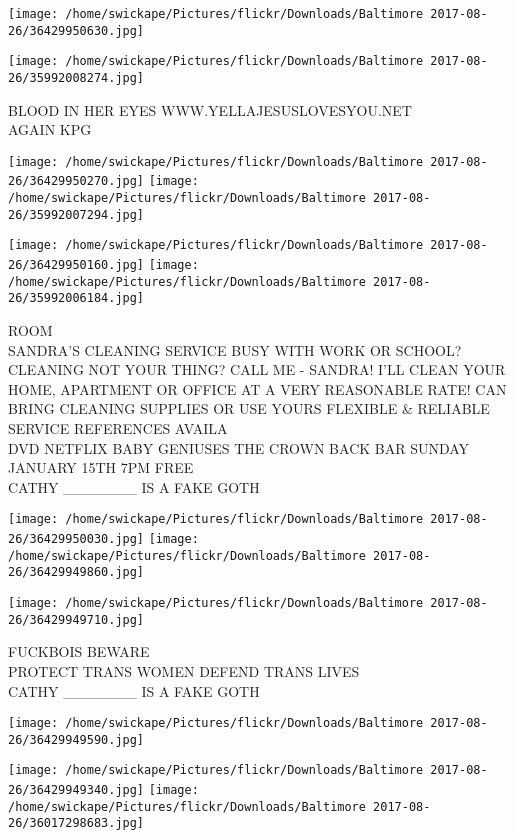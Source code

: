 \documentclass[10pt,letterpaper]{article}
\begin{document}
\texttt{[image: /home/swickape/Pictures/flickr/Downloads/Baltimore 2017-08-26/36429950630.jpg]}

\vspace{0.25in}
\texttt{[image: /home/swickape/Pictures/flickr/Downloads/Baltimore 2017-08-26/35992008274.jpg]}

BLOOD IN HER EYES WWW.YELLAJESUSLOVESYOU.NET\\
AGAIN KPG\\
\pagebreak

\texttt{[image: /home/swickape/Pictures/flickr/Downloads/Baltimore 2017-08-26/36429950270.jpg]}
\texttt{[image: /home/swickape/Pictures/flickr/Downloads/Baltimore 2017-08-26/35992007294.jpg]}

\texttt{[image: /home/swickape/Pictures/flickr/Downloads/Baltimore 2017-08-26/36429950160.jpg]}
\texttt{[image: /home/swickape/Pictures/flickr/Downloads/Baltimore 2017-08-26/35992006184.jpg]}

ROOM\\
SANDRA'S CLEANING SERVICE BUSY WITH WORK OR SCHOOL?  CLEANING NOT YOUR THING?  CALL ME {-} SANDRA!   I'LL CLEAN YOUR HOME, APARTMENT OR OFFICE AT A VERY REASONABLE RATE!  CAN BRING CLEANING SUPPLIES OR USE YOURS FLEXIBLE \& RELIABLE SERVICE REFERENCES AVAILA\\
DVD NETFLIX BABY GENIUSES THE CROWN BACK BAR SUNDAY JANUARY 15TH 7PM FREE\\
CATHY \_\_\_\_\_\_\_ IS A FAKE GOTH\\
\pagebreak

\texttt{[image: /home/swickape/Pictures/flickr/Downloads/Baltimore 2017-08-26/36429950030.jpg]}
\texttt{[image: /home/swickape/Pictures/flickr/Downloads/Baltimore 2017-08-26/36429949860.jpg]}

\texttt{[image: /home/swickape/Pictures/flickr/Downloads/Baltimore 2017-08-26/36429949710.jpg]}

FUCKBOIS BEWARE\\
PROTECT TRANS WOMEN DEFEND TRANS LIVES\\
CATHY \_\_\_\_\_\_\_ IS A FAKE GOTH\\
\pagebreak

\texttt{[image: /home/swickape/Pictures/flickr/Downloads/Baltimore 2017-08-26/36429949590.jpg]}

\vspace{0.25in}
\texttt{[image: /home/swickape/Pictures/flickr/Downloads/Baltimore 2017-08-26/36429949340.jpg]}
\texttt{[image: /home/swickape/Pictures/flickr/Downloads/Baltimore 2017-08-26/36017298683.jpg]}
\end{document}
